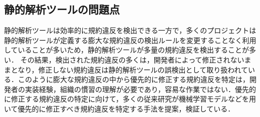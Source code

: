 \documentclass[T,J]{fose} %
\begin{document}



\subsection{静的解析ツールの問題点}

静的解析ツールは効率的に規約違反を検出できる一方で，多くのプロジェクトは静的解析ツールが定義する膨大な規約違反の検出ルールを変更することなく利用していることが多いため，静的解析ツールが多量の規約違反を検出することが多い．
その結果，検出された規約違反の多くは，開発者によって修正されないままとなり，修正しない規約違反は静的解析ツールの誤検出として取り扱われている．このように膨大な規約違反の中から優先的に修正する規約違反を特定は，開発者の実装経験，組織の慣習の理解が必要であり，容易な作業ではない\cite{HowFar}\cite{shuseisarenai}．優先的に修正する規約違反の特定に向けて，多くの従来研究が機械学習モデルなどを用いて優先的に修正すべき規約違反を特定する手法を提案，検証している．
\end{document}
